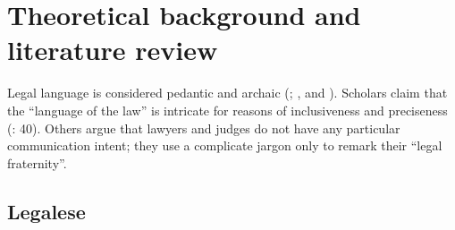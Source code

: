\documentclass[output=paper]{langscibook}
\begin{document}
\section{Theoretical background and literature review}\label{sec:giampieri:2}

Legal language is considered pedantic and archaic (\citealt{Bhatia1997}; \citealt{Williams2004}, \citealt{Williams2011} and \citealt{Williams2023}). Scholars claim that the “language of the law” \citep{Mellinkoff2004} is intricate for reasons of inclusiveness and preciseness (\citealt{CoulthardJohnson2007}: 40). Others argue that lawyers and judges do not have any particular communication intent; they use a complicate jargon only to remark their “legal fraternity”. \citep[52]{Tiersma1999}

\subsection{Legalese}\label{sec:giampieri:2.1}
\end{document}
